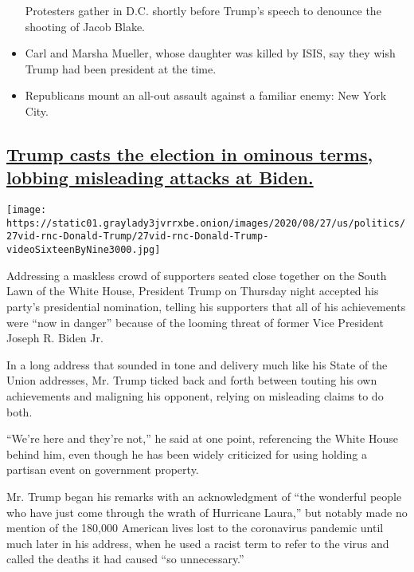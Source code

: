 \begin{itemize}
  Protesters gather in D.C. shortly before Trump's speech to denounce
  the shooting of Jacob Blake.
\item
  \protect\hyperlink{carl-and-marsha-mueller-whose-daughter-was-killed-by-isis-say-they-wish-trump-had-been-president-at-the-time}{}

  Carl and Marsha Mueller, whose daughter was killed by ISIS, say they
  wish Trump had been president at the time.
\item
  \protect\hyperlink{republicans-mount-an-all-out-assault-against-a-familiar-enemy-new-york-city}{}

  Republicans mount an all-out assault against a familiar enemy: New
  York City.
\end{itemize}

\hypertarget{trump-casts-the-election-in-ominous-terms-lobbing-misleading-attacks-at-biden}{%
\subsection{\texorpdfstring{\protect\hyperlink{trump-casts-the-election-in-ominous-terms-lobbing-misleading-attacks-at-biden}{Trump
casts the election in ominous terms, lobbing misleading attacks at
Biden.}}{Trump casts the election in ominous terms, lobbing misleading attacks at Biden.}}\label{trump-casts-the-election-in-ominous-terms-lobbing-misleading-attacks-at-biden}}

\texttt{[image: https://static01.graylady3jvrrxbe.onion/images/2020/08/27/us/politics/27vid-rnc-Donald-Trump/27vid-rnc-Donald-Trump-videoSixteenByNine3000.jpg]}

Addressing a maskless crowd of supporters seated close together on the
South Lawn of the White House, President Trump on Thursday night
accepted his party's presidential nomination, telling his supporters
that all of his achievements were ``now in danger'' because of the
looming threat of former Vice President Joseph R. Biden Jr.

In a long address that sounded in tone and delivery much like his State
of the Union addresses, Mr. Trump ticked back and forth between touting
his own achievements and maligning his opponent, relying on misleading
claims to do both.

``We're here and they're not,'' he said at one point, referencing the
White House behind him, even though he has been widely criticized for
using holding a partisan event on government property.

Mr. Trump began his remarks with an acknowledgment of ``the wonderful
people who have just come through the wrath of Hurricane Laura,'' but
notably made no mention of the 180,000 American lives lost to the
coronavirus pandemic until much later in his address, when he used a
racist term to refer to the virus and called the deaths it had caused
``so unnecessary.''

